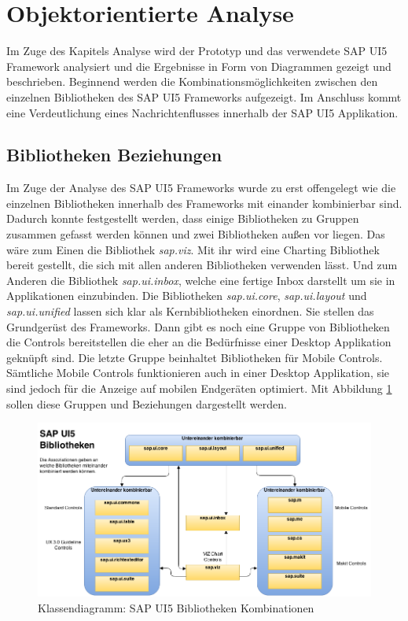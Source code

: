 \section{Objektorientierte Analyse}\label{analyse}
Im Zuge des Kapitels Analyse wird der Prototyp und das verwendete SAP UI5 Framework analysiert und die Ergebnisse in Form von Diagrammen gezeigt und beschrieben. Beginnend werden die Kombinationsmöglichkeiten zwischen den einzelnen Bibliotheken des SAP UI5 Frameworks aufgezeigt. Im Anschluss kommt eine Verdeutlichung eines Nachrichtenflusses innerhalb der SAP UI5 Applikation.

\subsection{Bibliotheken Beziehungen}
Im Zuge der Analyse des SAP UI5 Frameworks wurde zu erst offengelegt wie die einzelnen Bibliotheken innerhalb des Frameworks mit einander kombinierbar sind. Dadurch konnte festgestellt werden, dass einige Bibliotheken zu Gruppen zusammen gefasst werden können und zwei Bibliotheken außen vor liegen. Das wäre zum Einen die Bibliothek \textit{sap.viz}. Mit ihr wird eine Charting Bibliothek bereit gestellt, die sich mit allen anderen Bibliotheken verwenden lässt. Und zum Anderen die Bibliothek \textit{sap.ui.inbox}, welche eine fertige Inbox darstellt um sie in Applikationen einzubinden. Die Bibliotheken \textit{sap.ui.core}, \textit{sap.ui.layout} und \textit{sap.ui.unified} lassen sich klar als Kernbibliotheken einordnen. Sie stellen das Grundgerüst des Frameworks. Dann gibt es noch eine Gruppe von Bibliotheken die Controls bereitstellen die eher an die Bedürfnisse einer Desktop Applikation geknüpft sind. Die letzte Gruppe beinhaltet Bibliotheken für Mobile Controls. Sämtliche Mobile Controls funktionieren auch in einer Desktop Applikation, sie sind jedoch für die Anzeige auf mobilen Endgeräten optimiert. Mit Abbildung \ref{fig:sapui5libconnections} sollen diese Gruppen und Beziehungen dargestellt werden.

\vspace{1em}
\begin{figure}[htb]
  \centering
  \includegraphics[width=0.95\linewidth]{abb/sapui5_lib_connections}
  \caption[Klassendiagramm: SAP UI5 Bibliotheken Kombinationen]{Klassendiagramm: SAP UI5 Bibliotheken Kombinationen}
  \label{fig:sapui5libconnections}
\end{figure}

